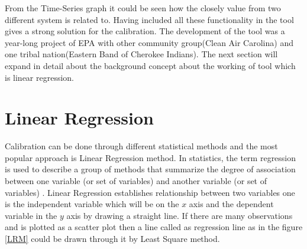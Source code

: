 \documentclass[12pt,a4paper,oneside]{report}
\begin{document}
From the Time-Series graph it could be seen how the closely value from two different system is related to.
Having included all these functionality in the tool gives a strong solution for the calibration. The development of the tool was a year-long project of EPA with other community group(Clean Air
Carolina) and  one tribal nation(Eastern Band of Cherokee Indians). The next section will expand in detail about the background concept about the working of tool which is linear regression.

\section*{Linear Regression}

Calibration can be done through different statistical methods and the most popular approach is Linear Regression method. In statistics, the term regression is used to describe a group of methods that summarize the degree of association between one variable (or set of variables) and another variable (or set of variables) \cite{Burke}. Linear Regression establishes relationship between two variables one is the independent variable which will be on the $x$ axis and the dependent variable in the $y$ axis by drawing a straight line.
If there are many observations and is plotted as a scatter plot then a line called as regression line as in the figure \ref{LRM} could be drawn through it by Least Square method. 
\end{document}
